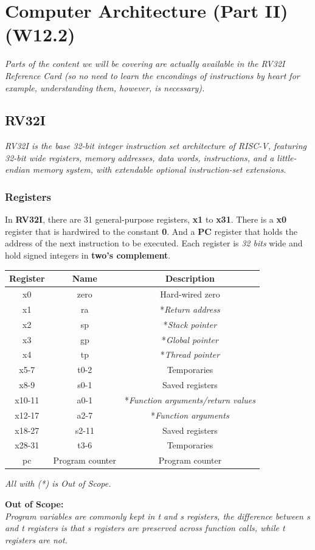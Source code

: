 \documentclass[12pt,openany]{book}
\begin{document}
\chapter{Computer Architecture (Part II) (W12.2)}
\textit{Parts of the content we will be covering are actually available in the RV32I Reference Card (so no need to learn the encondings of instructions by heart for example, understanding them, however, is necessary).}
\section{RV32I}
\textit{RV32I is the base 32-bit integer instruction set architecture of RISC-V, featuring 32-bit wide registers, memory addresses, data words, instructions, and a little-endian memory system, with extendable optional instruction-set extensions.}
\subsection{Registers}
In \textbf{RV32I}, there are 31 general-purpose registers, \textbf{x1} to \textbf{x31}. There is a \textbf{x0} register that is hardwired to the constant \textbf{0}. And a \textbf{PC} register that holds the address of the next instruction to be executed. Each register is \textit{32 bits} wide and hold signed integers in \textbf{two's complement}.
\begin{center}
	\begin{tabular}{|c|c|c|}
	\hline
	\textbf{Register} & \textbf{Name} & \textbf{Description} \\
	\hline
	x0 & zero & Hard-wired zero \\
	\hline
	x1 & ra & *\textit{Return address} \\
	\hline
	x2 & sp & *\textit{Stack pointer} \\
	\hline
	x3 & gp & *\textit{Global pointer} \\
	\hline
	x4 & tp & *\textit{Thread pointer} \\
	\hline
	x5-7 & t0-2 & Temporaries \\
	\hline
	x8-9 & s0-1 & Saved registers \\
	\hline
	x10-11 & a0-1 & *\textit{Function arguments/return values} \\
	\hline
	x12-17 & a2-7 & *\textit{Function arguments} \\
	\hline
	x18-27 & s2-11 & Saved registers \\
	\hline
	x28-31 & t3-6 & Temporaries \\
	\hline
	pc & Program counter & Program counter \\
	\hline
\end{tabular}\newline
\textit{All with (*) is Out of Scope.}
\end{center}
\textbf{Out of Scope:} \\
\textit{Program variables are commonly kept in t and s registers, the difference between s and t registers is that s registers are preserved across function calls, while t registers are not.}
\end{document}
